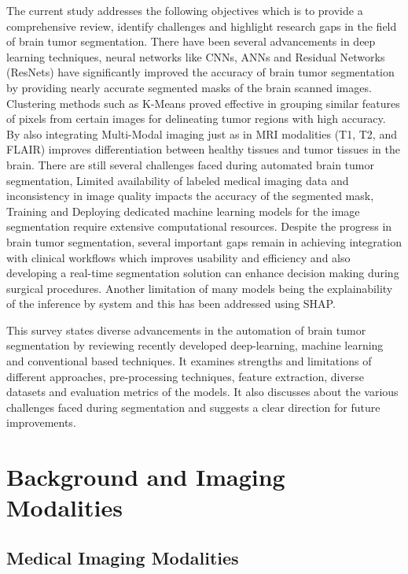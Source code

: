 \documentclass[conference]{IEEEtran}
\begin{document}
The current study addresses the following objectives which is to provide a comprehensive review, identify challenges and highlight research gaps in the field of brain tumor segmentation. There have been several advancements in deep learning techniques, neural networks like CNNs, ANNs and Residual Networks (ResNets) have significantly improved the accuracy of brain tumor segmentation by providing nearly accurate segmented masks of the brain scanned images. Clustering methods such as K-Means proved effective in grouping similar features of pixels from certain images for delineating tumor regions with high accuracy\cite{b2}. By also integrating Multi-Modal imaging just as in MRI modalities (T1, T2, and FLAIR) improves differentiation between healthy tissues and tumor tissues in the brain. There are still several challenges faced during automated brain tumor segmentation, Limited availability of labeled medical imaging data and inconsistency in image quality impacts the accuracy of the segmented mask, Training and Deploying dedicated machine learning models for the image segmentation require extensive computational resources. Despite the progress in brain tumor segmentation, several important gaps remain in achieving integration with clinical workflows which improves usability and efficiency and also developing a real-time segmentation solution can enhance decision making during surgical procedures. Another limitation of many models being the explainability of the inference by system and this has been addressed using SHAP\cite{b4}.

This survey states diverse advancements in the automation of brain tumor segmentation by reviewing recently developed deep-learning, machine learning and conventional based techniques. It examines strengths and limitations of different approaches, pre-processing techniques, feature extraction, diverse datasets and evaluation metrics of the models. It also discusses about the various challenges faced during segmentation and suggests a clear direction for future improvements.

\section{Background and Imaging Modalities}

\subsection{Medical Imaging Modalities}
\end{document}
